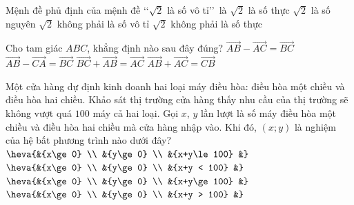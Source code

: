 \begin{ex}%
	Mệnh đề phủ định của mệnh đề \lq\lq $\sqrt{2}$ là số vô tỉ\rq\rq\, là
	\choice
	{$\sqrt{2}$ là số thực}
	{$\sqrt{2}$ là số nguyên}
	{\True $\sqrt{2}$ không phải là số vô tỉ}
	{$\sqrt{2}$ không phải là số thực}
\end{ex}
\begin{ex}%
	Cho tam giác $ABC$, khẳng định nào sau đây đúng?
	\choice
	{$\overrightarrow{AB}-\overrightarrow{AC}=\overrightarrow{BC}$}
	{$\overrightarrow{AB}-\overrightarrow{CA}=\overrightarrow{BC}$}
	{\True $\overrightarrow{BC}+\overrightarrow{AB}=\overrightarrow{AC}$}
	{$\overrightarrow{AB}+\overrightarrow{AC}=\overrightarrow{CB}$}
\end{ex}
\begin{ex}%
	Một cửa hàng dự định kinh doanh hai loại máy điều hòa: điều hòa một chiều và điều hòa hai chiều. Khảo sát thị trường cửa hàng thấy nhu cầu của thị trường sẽ không vượt quá $100$ máy cả hai loại. Gọi $x$, $y$ lần lượt là số máy điều hòa một chiều và điều hòa hai chiều mà cửa hàng nhập vào. Khi đó, $(x;y)$ là nghiệm của hệ bất phương trình nào dưới đây?
	\choice
	{\True $\heva{&{x\ge 0} \\
			&{y\ge 0} \\
			&{x+y\le 100}
			&}$}
	{$\heva{&{x\ge 0} \\
			&{y\ge 0} \\
			&{x+y < 100}
			&}$}
	{$\heva{&{x\ge 0} \\
			&{y\ge 0} \\
			&{x+y\ge 100}
			&}$}
	{$\heva{&{x\ge 0} \\
			&{y\ge 0} \\
			&{x+y > 100}
			&}$}
\end{ex}
